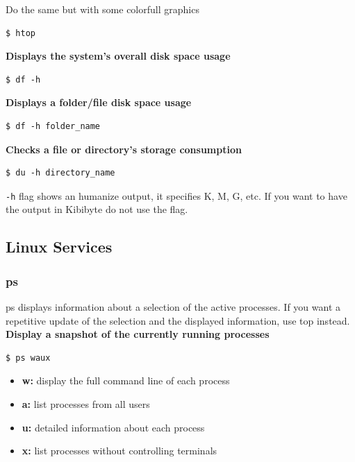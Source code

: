 \documentclass{article}
\newenvironment{blocktemplate}[1]{%
    \tcolorbox[beamer,%
    noparskip,breakable,
    colframe=Blue,%
    colbacklower=LimeGreen!75!LightGreen,%
    title=#1]}%
    {\endtcolorbox}
\newenvironment{codetemplate}[1][]{%
  \mybasecolorbox[#1]
  \itshape
}{%
  \endmybasecolorbox
}
\begin{document}
Do the same but with some colorfull graphics
\begin{codetemplate}{}
\begin{verbatim}
$ htop
\end{verbatim}
\end{codetemplate}

\textbf{Displays the system’s overall disk space usage}
\begin{codetemplate}{}
\begin{verbatim}
$ df -h
\end{verbatim}
\end{codetemplate}

\textbf{Displays a folder/file disk space usage}
\begin{codetemplate}{}
\begin{verbatim}
$ df -h folder_name
\end{verbatim}
\end{codetemplate}

\textbf{Checks a file or directory’s storage consumption}
\begin{codetemplate}{}
\begin{verbatim}
$ du -h directory_name
\end{verbatim}
\end{codetemplate}

\begin{blocktemplate}{NOTE}
\verb|-h| flag shows an humanize output, it specifies K, M, G, etc. If you want to have the output in Kibibyte do not use the flag.
\end{blocktemplate}

\subsection{Linux Services}

\subsubsection{ps}
ps displays information about a selection of the active processes.  If you want a repetitive update of the selection and the displayed information, use top instead.
\textbf{Display a snapshot of the currently running processes}
\begin{codetemplate}{}
\begin{verbatim}
$ ps waux
\end{verbatim}
\end{codetemplate}
\begin{itemize}
    \item \textbf{w:} display the full command line of each process
    \item \textbf{a:} list processes from all users
    \item \textbf{u:} detailed information about each process
    \item \textbf{x:} list processes without controlling terminals
\end{itemize}
\end{document}
